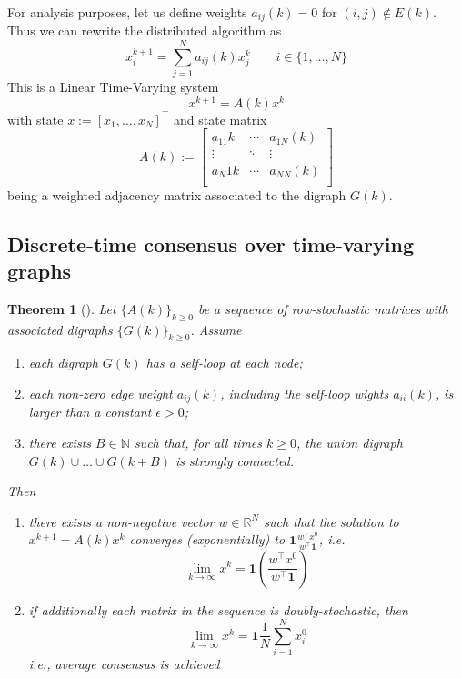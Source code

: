 \documentclass{book}
\newcommand{\R}{\mathbb{R}}
\newcommand{\N}{\mathbb{N}}
\theoremstyle{theoremv2}
\newtheorem{theorem}{Theorem}[chapter]
\theoremstyle{defv2}
\theoremstyle{remark}
\theoremstyle{remark}
\theoremstyle{definition}
\theoremstyle{definition}
\begin{document}
For analysis purposes, let us define weights $a_{ij}(k)=0$ for $(i,j)\notin E(k)$. Thus we can rewrite the distributed algorithm as 
\[
    x_i^{k+1} = \displaystyle\sum_{j=1}^{N} a_{ij}(k) x_j^k \qquad i\in\{1,\dots,N\}
\]
This is a Linear Time-Varying system 
\[
    x^{k+1} = A(k)x^k
\]
with state $x:=[x_1,\dots,x_N]^\top$ and state matrix
\[
    A(k) := \begin{bmatrix}
        a_11{k}& \cdots & a_{1N}(k) \\
        \vdots & \ddots & \vdots \\
        a_N1{k}& \cdots & a_{NN}(k) \\
    \end{bmatrix}
\]
being a weighted adjacency matrix associated to the digraph $G(k)$.
\subsection{Discrete-time consensus over time-varying graphs}
\begin{theorem}[]
    Let $\{A(k)\}_{k\geq 0}$ be a sequence of row-stochastic matrices with associated digraphs $\{G(k)\}_{k\geq 0}$. Assume 
    \begin{enumerate}
        \item each digraph $G(k)$ has a self-loop at each node; 
        \item each non-zero edge weight $a_{ij}(k)$, including the self-loop wights $a_{ii}(k)$, is larger than a constant $\epsilon>0$; 
        \item there exists $B\in\N$ such that, for all times $k\geq 0$, the union digraph $G(k)\cup \dots \cup G(k+B)$ is strongly connected. 
    \end{enumerate}
    Then 
    \begin{enumerate}
        \item there exists a non-negative vector $w\in\R^N$ such that the solution to $x^{k+1}=A(k)x^k$ converges (exponentially) to $\mathbf{1}\displaystyle\frac{w^\top x^0}{w^\top \mathbf{1}}$, i.e.
            \[
                \lim_{k\to\infty}x^k = \mathbf{1}\left(\displaystyle\frac{w^\top x^0}{w^\top \mathbf{1}}\right)
            \]
        \item if additionally each matrix in the sequence is doubly-stochastic, then 
            \[
                \lim_{k\to\infty} x^k = \mathbf{1} \displaystyle\frac{1}{N}\displaystyle\sum_{i=1}^{N}x_i^0
            \]
            i.e., average consensus is achieved
    \end{enumerate}
\end{theorem}
\end{document}
